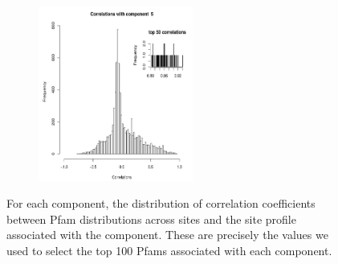 \begin{figure}[!ht]
\begin{subfigure}[t]{2in}
 \end{subfigure}
 \begin{subfigure}[t]{2in}
    \includegraphics[width=2in]{NMF/figures/figS7e}
 \end{subfigure}
 \caption{For each component, the distribution of correlation coefficients between Pfam distributions across sites and the site profile associated with the component.  These are precisely the values we used to select the top 100 Pfams associated with each component.}
 \label{simHist}
\end{figure}

